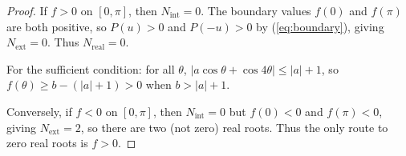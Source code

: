 \documentclass[10pt,a4paper]{amsart}
\begin{document}
\begin{proof}
If $f > 0$ on $[0,\pi]$, then $N_{\mathrm{int}} = 0$. The boundary values $f(0)$ and $f(\pi)$ are both positive, so $P(u) > 0$ and $P(-u) > 0$ by (\ref{eq:boundary}), giving $N_{\mathrm{ext}} = 0$. Thus $N_{\mathrm{real}} = 0$.

For the sufficient condition: for all $\theta$, $|a\cos\theta + \cos 4\theta| \leq |a| + 1$, so $f(\theta) \geq b - (|a|+1) > 0$ when $b > |a| + 1$.

Conversely, if $f < 0$ on $[0,\pi]$, then $N_{\mathrm{int}} = 0$ but $f(0) < 0$ and $f(\pi) < 0$, giving $N_{\mathrm{ext}} = 2$, so there are two (not zero) real roots. Thus the only route to zero real roots is $f > 0$.
\end{proof}
\end{document}
